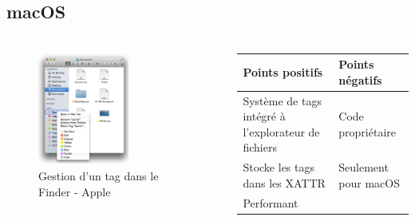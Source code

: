 \documentclass[10pt]{beamer}
\begin{document}
\subsection{macOS}
\begin{frame}
    \frametitle{\subsecname}
    \fontsize{6pt}{8}\selectfont
    \begin{columns}[T]
        \begin{column}{.65\textwidth}
            \begin{center}
                \begin{figure}
                    \includegraphics[width=0.6\textwidth]{images/macos_tags.png}
                    \caption{Gestion d'un tag dans le Finder - Apple}
                \end{figure}
            \end{center}
        \end{column}
        \pause
        \fontsize{8pt}{9}\selectfont
        \begin{column}{.35\textwidth}
            \begin{center}
                \begin{tabularx}{3.5cm}{|X|X|} \hline
                    \textbf{Points positifs} & \textbf{Points négatifs} \\ \hline
                    Système de tags intégré à l'explorateur de fichiers & Code propriétaire \\ \hline
                    Stocke les tags dans les XATTR & Seulement pour macOS \\ \hline
                    Performant & \\ \hline
                \end{tabularx}
            \end{center}
        \end{column}
    \end{columns}
\end{frame}
\end{document}
